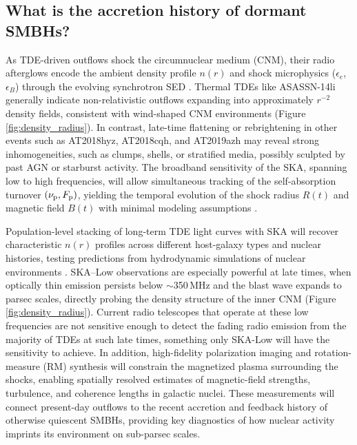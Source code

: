 \documentclass[a4paper,11pt]{article}
\begin{document}
\subsection{What is the accretion history of dormant SMBHs?
}

As TDE-driven outflows shock the circumnuclear medium (CNM), their radio afterglows encode the ambient density profile $n(r)$ and shock microphysics ($\epsilon_e$, $\epsilon_B$) through the evolving synchrotron SED \citep[e.g.,][]{Chevalier1998,Metzger2016}. Thermal TDEs like ASASSN-14li \citep{Alexander2016,vanVelzen2016,Bright2018} generally indicate non-relativistic outflows expanding into approximately $r^{-2}$ density fields, consistent with wind-shaped CNM environments (Figure \ref{fig:density_radius}). In contrast, late-time flattening or rebrightening in other events such as AT2018hyz, AT2018cqh, and AT2019azh \citep{Cendes2022,Goodwin2022, Yang2025} may reveal strong inhomogeneities, such as clumps, shells, or stratified media, possibly sculpted by past AGN or starburst activity. The broadband sensitivity of the SKA, spanning low to high frequencies, will allow simultaneous tracking of the self-absorption turnover $(\nu_{\rm p},F_{\rm p})$, yielding the temporal evolution of the shock radius $R(t)$ and magnetic field $B(t)$ with minimal modeling assumptions \citep[e.g.][]{BarniolDuran2013,Matsumoto2022}. 

Population-level stacking of long-term TDE light curves with SKA will recover characteristic $n(r)$ profiles across different host-galaxy types and nuclear histories, testing predictions from hydrodynamic simulations of nuclear environments \citep[e.g.,][]{Generozov2017,Mockler2023}. SKA--Low observations are especially powerful at late times, when optically thin emission persists below $\sim$350\,MHz and the blast wave expands to parsec scales, directly probing the density structure of the inner CNM (Figure \ref{fig:density_radius}). Current radio telescopes that operate at these low frequencies are not sensitive enough to detect the fading radio emission from the majority of TDEs at such late times, something only SKA-Low will have the sensitivity to achieve. In addition, high-fidelity polarization imaging and rotation-measure (RM) synthesis \citep{Brentjens2005} will constrain the magnetized plasma surrounding the shocks, enabling spatially resolved estimates of magnetic-field strengths, turbulence, and coherence lengths in galactic nuclei. These measurements will connect present-day outflows to the recent accretion and feedback history of otherwise quiescent SMBHs, providing key diagnostics of how nuclear activity imprints its environment on sub-parsec scales.
\end{document}

